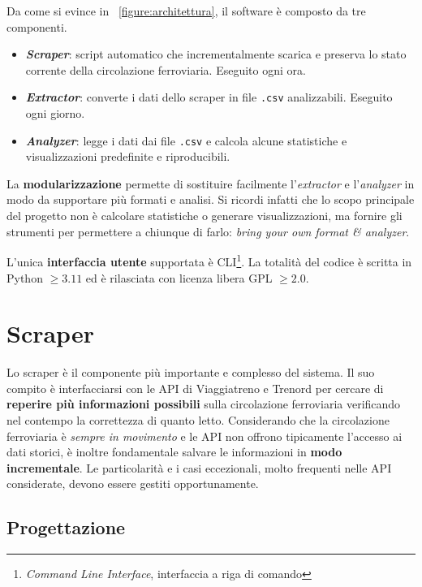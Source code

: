 \documentclass[12pt,italian]{report}
\begin{document}
Da come si evince in \figurename~\ref{figure:architettura}, il
software è composto da tre componenti.
\begin{itemize}
    \item \textbf{\textit{Scraper}}: script automatico che
    incrementalmente scarica e preserva lo stato corrente della
    circolazione ferroviaria.  Eseguito ogni ora.
    \item \textbf{\textit{Extractor}}: converte i dati dello scraper
    in file \texttt{.csv} analizzabili.  Eseguito ogni giorno.
    \item \textbf{\textit{Analyzer}}: legge i dati dai file
    \texttt{.csv} e calcola alcune statistiche e visualizzazioni
    predefinite e riproducibili.
\end{itemize}

La \textbf{modularizzazione} permette di sostituire facilmente
l'\textit{extractor} e l'\textit{analyzer} in modo da supportare più
formati e analisi.  Si ricordi infatti che lo scopo principale del
progetto non è calcolare statistiche o generare visualizzazioni, ma
fornire gli strumenti per permettere a chiunque di farlo:
\textit{bring your own format \& analyzer}.

L'unica \textbf{interfaccia utente} supportata è
CLI\footnote{\textit{Command Line Interface}, interfaccia a riga di
    comando}.  La totalità del codice è scritta in Python $\geq 3.11$
ed è rilasciata con licenza libera GPL $\geq 2.0$.

\section{Scraper}

Lo scraper è il componente più importante e complesso del sistema.  Il
suo compito è interfacciarsi con le API di Viaggiatreno e Trenord per
cercare di \textbf{reperire più informazioni possibili} sulla
circolazione ferroviaria verificando nel contempo la correttezza di
quanto letto.  Considerando che la circolazione ferroviaria è
\textit{sempre in movimento} e le API non offrono tipicamente
l'accesso ai dati storici, è inoltre fondamentale salvare le
informazioni in \textbf{modo incrementale}.  Le particolarità e i casi
eccezionali, molto frequenti nelle API considerate, devono essere
gestiti opportunamente.

\subsection{Progettazione}
\end{document}
